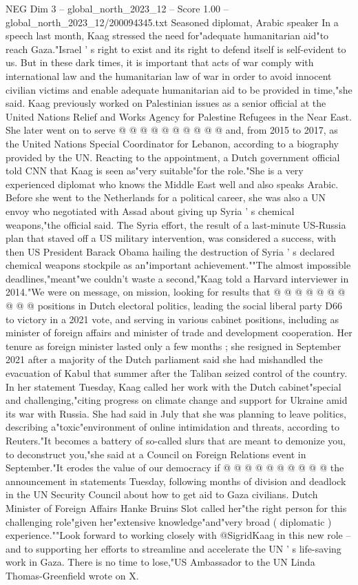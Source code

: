 \begin{textsample}{NEG Dim 3 – global\_north\_2023\_12 – Score 1.00 – global\_north\_2023\_12/200094345.txt}
Seasoned diplomat, Arabic speaker In a speech last month, Kaag stressed the need for"adequate humanitarian aid"to reach Gaza."Israel ' s right to exist and its right to defend itself is self-evident to us.
But in these dark times, it is important that acts of war comply with international law and the humanitarian law of war in order to avoid innocent civilian victims and enable adequate humanitarian aid to be provided in time,"she said.
Kaag previously worked on Palestinian issues as a senior official at the United Nations Relief and Works Agency for Palestine Refugees in the Near East.
She later went on to serve @ @ @ @ @ @ @ @ @ @ and, from 2015 to 2017, as the United Nations Special Coordinator for Lebanon, according to a biography provided by the UN.
Reacting to the appointment, a Dutch government official told CNN that Kaag is seen as"very suitable"for the role."She is a very experienced diplomat who knows the Middle East well and also speaks Arabic.
Before she went to the Netherlands for a political career, she was also a UN envoy who negotiated with Assad about giving up Syria ' s chemical weapons,"the official said.
The Syria effort, the result of a last-minute US-Russia plan that staved off a US military intervention, was considered a success, with then US President Barack Obama hailing the destruction of Syria ' s declared chemical weapons stockpile as an"important achievement.""The almost impossible deadlines,"meant"we couldn't waste a second,"Kaag told a Harvard interviewer in 2014."We were on message, on mission, looking for results that @ @ @ @ @ @ @ @ @ @ positions in Dutch electoral politics, leading the social liberal party D66 to victory in a 2021 vote, and serving in various cabinet positions, including as minister of foreign affairs and minister of trade and development cooperation.
Her tenure as foreign minister lasted only a few months ; she resigned in September 2021 after a majority of the Dutch parliament said she had mishandled the evacuation of Kabul that summer after the Taliban seized control of the country.
In her statement Tuesday, Kaag called her work with the Dutch cabinet"special and challenging,"citing progress on climate change and support for Ukraine amid its war with Russia.
She had said in July that she was planning to leave politics, describing a"toxic"environment of online intimidation and threats, according to Reuters."It becomes a battery of so-called slurs that are meant to demonize you, to deconstruct you,"she said at a Council on Foreign Relations event in September."It erodes the value of our democracy if @ @ @ @ @ @ @ @ @ @ the announcement in statements Tuesday, following months of division and deadlock in the UN Security Council about how to get aid to Gaza civilians.
Dutch Minister of Foreign Affairs Hanke Bruins Slot called her"the right person for this challenging role"given her"extensive knowledge"and"very broad ( diplomatic ) experience.""Look forward to working closely with @SigridKaag in this new role -- and to supporting her efforts to streamline and accelerate the UN ' s life-saving work in Gaza.
There is no time to lose,"US Ambassador to the UN Linda Thomas-Greenfield wrote on X.

\end{textsample}
